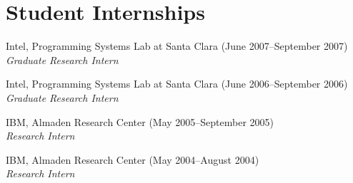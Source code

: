 \documentclass[10pt,letterpaper]{article}
\renewenvironment{itemize}{
  \begin{list}{}{
    \setlength{\leftmargin}{1.5em}
    \setlength{\itemsep}{0.25em}
    \setlength{\parskip}{0pt}
    \setlength{\parsep}{0.25em}
  }
}{
  \end{list}
}
\newenvironment{resexperience}[4]{
\item #1 (#3--#4) \\
\emph{#2}
}{
}
\begin{document}
\section*{Student Internships}

\begin{itemize}     
 
  \begin{resexperience}
    {Intel, Programming Systems Lab at Santa Clara}
    {Graduate Research Intern}
    {June 2007}
    {September 2007}    
  \end{resexperience}

  \begin{resexperience}
    {Intel, Programming Systems Lab at Santa Clara}
    {Graduate Research Intern}
    {June 2006}
    {September 2006}    
  \end{resexperience}

  \begin{resexperience}
    {IBM, Almaden Research Center}
    {Research Intern}
    {May 2005}
    {September 2005}
    

  \end{resexperience}
  
  \begin{resexperience}
    {IBM, Almaden Research Center}
    {Research Intern}
    {May 2004}
    {August 2004} 


  \end{resexperience}    
  

\end{itemize}
\end{document}
